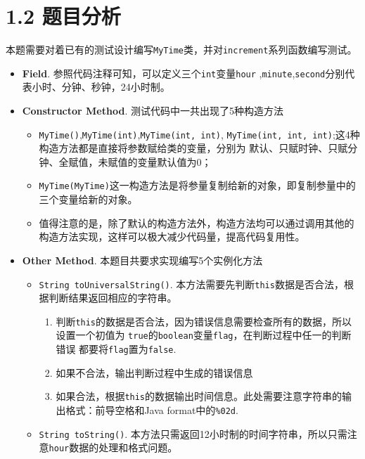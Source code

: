 \section{1.2 题目分析}

本题需要对着已有的测试设计编写\lstinline{MyTime}类，并对\lstinline{increment}系列函数编写测试。

\begin{itemize}
    \item \textbf{Field}. 参照代码注释可知，可以定义三个\lstinline{int}变量\lstinline{hour}
        ,\lstinline{minute},\lstinline{second}分别代表小时、分钟、秒钟，24小时制。
    \item \textbf{Constructor Method}. 测试代码中一共出现了5种构造方法
    \begin{itemize}
        \item \lstinline{MyTime()},\lstinline{MyTime(int)},\lstinline{MyTime(int, int)},
        \lstinline{MyTime(int, int, int)};这4种构造方法都是直接将参数赋给类的变量，分别为
        默认、只赋时钟、只赋分钟、全赋值，未赋值的变量默认值为0；
        \item \lstinline{MyTime(MyTime)}这一构造方法是将参量复制给新的对象，即复制参量中的三个变量给新的对象。
        \item 值得注意的是，除了默认的构造方法外，构造方法均可以通过调用其他的构造方法实现，这样可以极大减少代码量，提高代码复用性。
    \end{itemize}
    \item \textbf{Other Method}. 本题目共要求实现编写5个实例化方法
    \begin{itemize}
        \item \lstinline{String toUniversalString()}. 本方法需要先判断\lstinline{this}数据是否合法，根据判断结果返回相应的字符串。
        \begin{enumerate}
            \item 判断\lstinline{this}的数据是否合法，因为错误信息需要检查所有的数据，所以设置一个初值为
                \lstinline{true}的\lstinline{boolean}变量\lstinline{flag}，在判断过程中任一的判断错误
                都要将\lstinline{flag}置为\lstinline{false}.
            \item 如果不合法，输出判断过程中生成的错误信息
            \item 如果合法，根据\lstinline{this}的数据输出时间信息。此处需要注意字符串的输出格式：前导空格和Java format中的\lstinline{%02d}. 
        \end{enumerate}
        \item \lstinline{String toString()}. 本方法只需返回12小时制的时间字符串，所以只需注意\lstinline{hour}数据的处理和格式问题。

\end{itemize}
\end{itemize}
